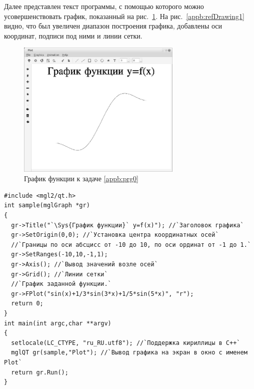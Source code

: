 Далее представлен текст программы, с помощью которого можно усовершенствовать график, показанный на рис.~\ref{appb:refDrawing0}. 
На рис.~\ref{appb:refDrawing1} видно, что был увеличен диапазон построения графика, добавлены оси координат,
подписи под ними и линии сетки.

\begin{figure}[htb]
\begin{center}
\includegraphics[width=0.7\textwidth]{img/ris_appb_1}
\caption{График функции к задаче \ref{appb:prg0}}
\label{appb:refDrawing0}
\end{center}
\end{figure}

\begin{lstlisting}
#include <mgl2/qt.h>
int sample(mglGraph *gr)
{
  gr->Title("`\Sys{График функции}` y=f(x)"); //`Заголовок графика`
  gr->SetOrigin(0,0); //`Установка центра координатных осей`
  //`Границы по оси абсцисс от -10 до 10, по оси ординат от -1 до 1.`
  gr->SetRanges(-10,10,-1,1);
  gr->Axis(); //`Вывод значений возле осей`
  gr->Grid(); //`Линии сетки`
  //`График заданной функции.`
  gr->FPlot("sin(x)+1/3*sin(3*x)+1/5*sin(5*x)", "r");
  return 0;
}
int main(int argc,char **argv)
{
  setlocale(LC_CTYPE, "ru_RU.utf8"); //`Поддержка кириллицы в С++`
  mglQT gr(sample,"Plot"); //`Вывод графика на экран в окно с именем Plot`
  return gr.Run();
}
\end{lstlisting}


